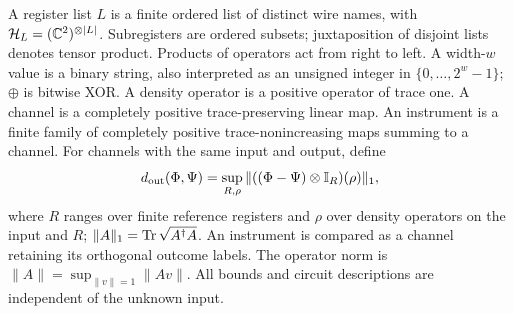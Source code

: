 \begin{definition}\label{def:registers}
A register list $L$ is a finite ordered list of distinct wire names, with
$\mathcal{H}_L=(\mathbb{C}^2)^{\otimes |L|}$. Subregisters are ordered subsets; juxtaposition
of disjoint lists denotes tensor product. Products of operators act from
right to left. A width-$w$ value is a binary string, also interpreted as
an unsigned integer in $\{0,\ldots,2^w-1\}$; $\oplus$ is bitwise XOR.
A density operator is a positive operator of trace one. A channel is a
completely positive trace-preserving linear map. An instrument is a finite
family of completely positive trace-nonincreasing maps summing to a channel.
For channels with the same input and output, define
\[
 d_{\rm out}(\Phi,\Psi)=
 \sup_{R,\rho}\|((\Phi-\Psi)\otimes\mathbb{I}_R)(\rho)\|_1,
\]
where $R$ ranges over finite reference registers and $\rho$ over density
operators on the input and $R$; $\|A\|_1=\operatorname{Tr}\sqrt{A^\dagger A}$.
An instrument is compared as a channel retaining its orthogonal outcome
labels. The operator norm is $\|A\|=\sup_{\|v\|=1}\|Av\|$.
All bounds and circuit descriptions are independent of the unknown input.
\end{definition}


